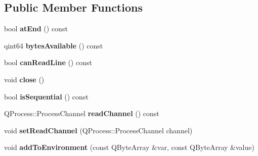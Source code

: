 \subsection*{Public Member Functions}
\begin{DoxyCompactItemize}
\item 
\mbox{\label{class_q_ssh_1_1_ssh_remote_process_a24434be4768725e83c377ad13b15a0c3}} 
bool {\bfseries at\+End} () const
\item 
\mbox{\label{class_q_ssh_1_1_ssh_remote_process_afdfe769a14ffdeaba1bd2ebffdcb7e51}} 
qint64 {\bfseries bytes\+Available} () const
\item 
\mbox{\label{class_q_ssh_1_1_ssh_remote_process_aee00f7146591e42dbcd6c70ffc8321bc}} 
bool {\bfseries can\+Read\+Line} () const
\item 
\mbox{\label{class_q_ssh_1_1_ssh_remote_process_a60babc62144d560a13c6f7f2ffbe1f0f}} 
void {\bfseries close} ()
\item 
\mbox{\label{class_q_ssh_1_1_ssh_remote_process_a9b2bbe5d64a2384cbdad9719b6bd77dc}} 
bool {\bfseries is\+Sequential} () const
\item 
\mbox{\label{class_q_ssh_1_1_ssh_remote_process_a5f2c49254588a0a008b505c684ab9a18}} 
Q\+Process\+::\+Process\+Channel {\bfseries read\+Channel} () const
\item 
\mbox{\label{class_q_ssh_1_1_ssh_remote_process_a5bc7aadb08c5f93528b904b3787beacd}} 
void {\bfseries set\+Read\+Channel} (Q\+Process\+::\+Process\+Channel channel)
\item 
\mbox{\label{class_q_ssh_1_1_ssh_remote_process_a19d8d056c47f92f736f9a06bd731fafc}} 
void {\bfseries add\+To\+Environment} (const Q\+Byte\+Array \&var, const Q\+Byte\+Array \&value)
\item 
\mbox{\label{class_q_ssh_1_1_ssh_remote_process_a5adf2d7cb34eb4464237a35ba654376b}} 

\end{DoxyCompactItemize}
